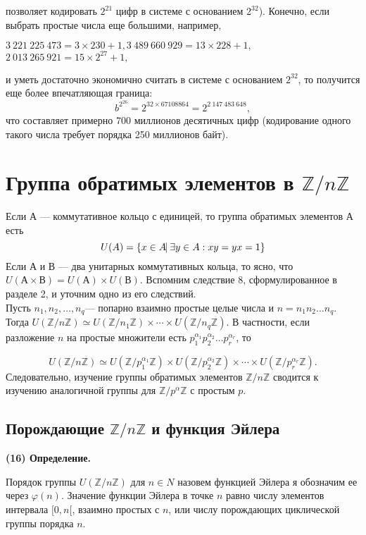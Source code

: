 \documentclass{mai_book}
\begin{document}
\hspace{-14pt}позволяет кодировать $2^{21}$ цифр в системе с основанием $2^{32}$). Конечно,
если выбрать простые числа еще большими, например,
\begin{center}
$3\ 221\ 225\ 473 = 3 \times 230 + 1, 3\ 489\ 660\ 929= 13 \times 228 + 1,$
$2\ 013\ 265\ 921 = 15\times2^{27} + 1,$
\end{center}
и уметь достаточно экономично считать в системе с основанием $2^{32}$,
то получится еще более впечатляющая граница:
$$b^{2^{26}} = 2^{32 \times 67108864} = 2^{2\ 147\ 483\ 648},$$
что составляет примерно 700 миллионов десятичных цифр 
(кодирование одного такого числа требует порядка 250 миллионов байт).
\vspace{10pt}


\sectiontop
\section{Группа обратимых элементов в $\mathbb{Z}/n\mathbb{Z}$}


\hspace{-14pt}Если А --- коммутативное кольцо с единицей, то группа обратимых
элементов А есть
$$U(A) = \{x \in A \vrule\ \exists y \in A:xy = yx = 1  \}$$
Если $А$ и $В$ — два унитарных коммутативных кольца, то ясно, что
$U(А \times В) = U(А) \times U(В)$. Вспомним следствие 8, сформулированное в
разделе 2, и уточним одно из его следствий. \\
Пусть $n_{1}, n_{2}, \ldots, n_{q}$--- попарно взаимно простые целые числа и $n = n_1n_2\ldots n_q$. Тогда $U(\mathbb{Z}/n\mathbb{Z})\simeq U(\mathbb{Z}/n_1\mathbb{Z})\times \cdots \times U(\mathbb{Z}/n_q\mathbb{Z})  $. В 
частности, если разложение $n$ на простые множители есть $p_1^{\alpha_1}p_2^{\alpha_2} \ldots p_r^{\alpha_r}$, то

$$U(\mathbb{Z}/n\mathbb{Z})\simeq U(\mathbb{Z}/p_1^{\alpha_1}\mathbb{Z})\times U(\mathbb{Z}/p_2^{\alpha_2}\mathbb{Z}) \times \cdots \times U(\mathbb{Z}/p_r^{\alpha_r}\mathbb{Z}).$$
Следовательно, изучение группы обратимых элементов $\mathbb{Z}/n\mathbb{Z}$ сводится к изучению аналогичной группы для $\mathbb{Z}/p^{\alpha}\mathbb{Z}$ с простым $p$. \\
\sectiontop
\subsection{Порождающие $\mathbb{Z}/n\mathbb{Z}$ и функция Эйлера}
\vspace{4pt}\textbf{(16) Определение.} 
\par
Порядок группы $U(\mathbb{Z}/n\mathbb{Z})$ для $n \in N$ назовем функцией Эйлера я обозначим ее через $\varphi(n)$. Значение функции Эйлера в точке $n$ равно числу элементов интервала $[0, n[$, взаимно простых с $n$, или числу порождающих циклической группы порядка $n$.
\pagebreak
\newpage
\end{document}
